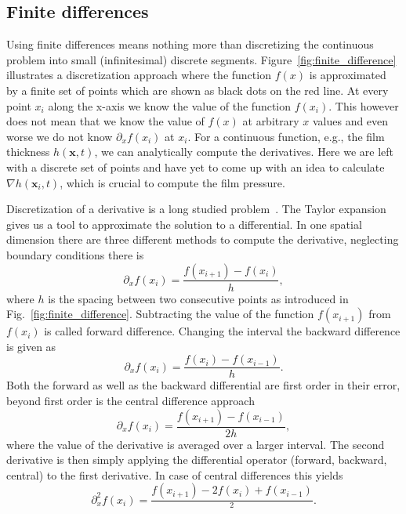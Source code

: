 \subsection{Finite differences}
Using finite differences means nothing more than discretizing the continuous problem into small (infinitesimal) discrete segments.
Figure~\ref{fig:finite_difference} illustrates a discretization approach where the function $f(x)$ is approximated by a finite set of points which are shown as black dots on the red line.
At every point $x_i$ along the x-axis we know the value of the function $f(x_i)$.
This however does not mean that we know the value of $f(x)$ at arbitrary $x$ values and even worse we do not know $\partial_x f(x_i)$ at $x_i$. 
For a continuous function, e.g., the film thickness $h(\mathbf{x},t)$, we can analytically compute the derivatives. 
Here we are left with a discrete set of points and have yet to come up with an idea to calculate $\nabla h(\mathbf{x}_i, t)$, which is crucial to compute the film pressure.

Discretization of a derivative is a long studied problem~\cite{booleTreatiseCalculusFinite1872, jordanCalculusFiniteDifferences1965}.
The Taylor expansion gives us a tool to approximate the solution to a differential.
In one spatial dimension there are three different methods to compute the derivative, neglecting boundary conditions there is
\begin{equation}\label{eq:forward_dif}
    \partial_x f(x_i) = \frac{f(x_{i+1}) - f(x_i)}{h},
\end{equation}
where $h$ is the spacing between two consecutive points as introduced in Fig.~\ref{fig:finite_difference}. 
Subtracting the value of the function $f(x_{i+1})$ from $f(x_i)$ is called forward difference.
Changing the interval the backward difference is given as
\begin{equation}\label{eq:backward_dif}
    \partial_x f(x_i) = \frac{f(x_i) - f(x_{i-1})}{h}.
\end{equation}
Both the forward as well as the backward differential are first order in their error, beyond first order is the central difference approach
\begin{equation}\label{eq:center_diff}
    \partial_x f(x_i) = \frac{f(x_{i+1}) - f(x_{i-1})}{2h},
\end{equation}
where the value of the derivative is averaged over a larger interval. 
The second derivative is then simply applying the differential operator (forward, backward, central) to  the first derivative. 
In case of central differences this yields
\begin{equation}\label{eq:second_central_diff}
    \partial_x^2 f(x_i) = \frac{f(x_{i+1})-2f(x_i)+f(x_{i-1})}{^2}.
\end{equation}


